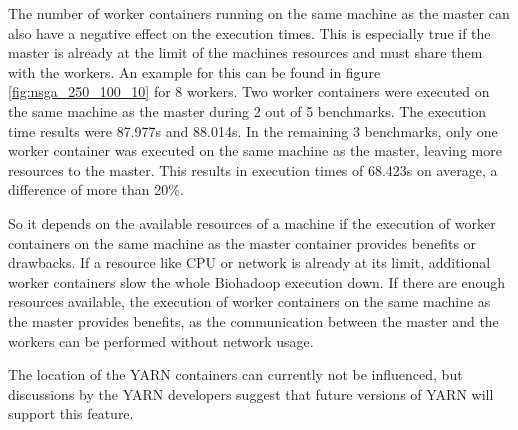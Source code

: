 
The number of worker containers running on the same machine as the master can also have a negative effect on the execution times. This is especially true if the master is already at the limit of the machines resources and must share them with the workers. An example for this can be found in figure \ref{fig:nsga_250_100_10} for 8 workers. Two worker containers were executed on the same machine as the master during 2 out of 5 benchmarks. The execution time results were 87.977s and 88.014s. In the remaining 3 benchmarks, only one worker container was executed on the same machine as the master, leaving more resources to the master. This results in execution times of 68.423s on average, a difference of more than 20\%.

So it depends on the available resources of a machine if the execution of worker containers on the same machine as the master container provides benefits or drawbacks. If a resource like CPU or network is already at its limit, additional worker containers slow the whole Biohadoop execution down. If there are enough resources available, the execution of worker containers on the same machine as the master provides benefits, as the communication between the master and the workers can be performed without network usage.

The location of the YARN containers can currently not be influenced, but discussions by the YARN developers suggest that future versions of YARN will support this feature.

